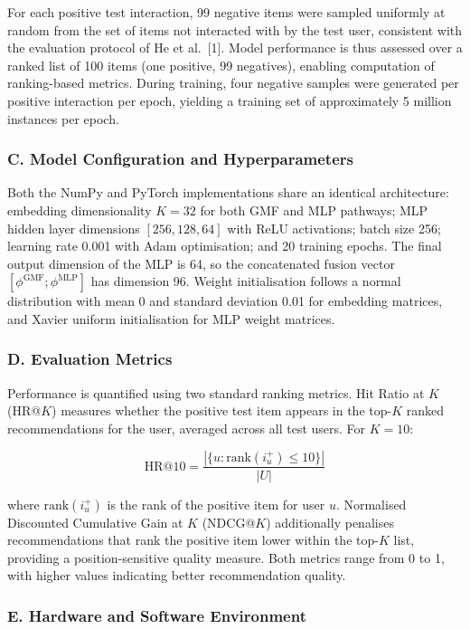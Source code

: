 \documentclass[
]{IEEEtran}
\begin{document}
For each positive test interaction, 99 negative items were sampled
uniformly at random from the set of items not interacted with by the
test user, consistent with the evaluation protocol of He et al.~{[}1{]}.
Model performance is thus assessed over a ranked list of 100 items (one
positive, 99 negatives), enabling computation of ranking-based metrics.
During training, four negative samples were generated per positive
interaction per epoch, yielding a training set of approximately 5
million instances per epoch.

\subsubsection{C. Model Configuration and
Hyperparameters}\label{c.-model-configuration-and-hyperparameters}

Both the NumPy and PyTorch implementations share an identical
architecture: embedding dimensionality \(K = 32\) for both GMF and MLP
pathways; MLP hidden layer dimensions \([256, 128, 64]\) with ReLU
activations; batch size 256; learning rate 0.001 with Adam optimisation;
and 20 training epochs. The final output dimension of the MLP is 64, so
the concatenated fusion vector
\([\phi^{\text{GMF}} ; \phi^{\text{MLP}}]\) has dimension 96. Weight
initialisation follows a normal distribution with mean 0 and standard
deviation 0.01 for embedding matrices, and Xavier uniform initialisation
for MLP weight matrices.

\subsubsection{D. Evaluation Metrics}\label{d.-evaluation-metrics}

Performance is quantified using two standard ranking metrics. Hit Ratio
at \(K\) (HR@\(K\)) measures whether the positive test item appears in
the top-\(K\) ranked recommendations for the user, averaged across all
test users. For \(K = 10\):

\[\text{HR@10} = \frac{|\{u : \text{rank}(i_u^+) \le 10\}|}{|U|}\]

where \(\text{rank}(i_u^+)\) is the rank of the positive item for user
\(u\). Normalised Discounted Cumulative Gain at \(K\) (NDCG@\(K\))
additionally penalises recommendations that rank the positive item lower
within the top-\(K\) list, providing a position-sensitive quality
measure. Both metrics range from 0 to 1, with higher values indicating
better recommendation quality.

\subsubsection{E. Hardware and Software
Environment}\label{e.-hardware-and-software-environment}
\end{document}

